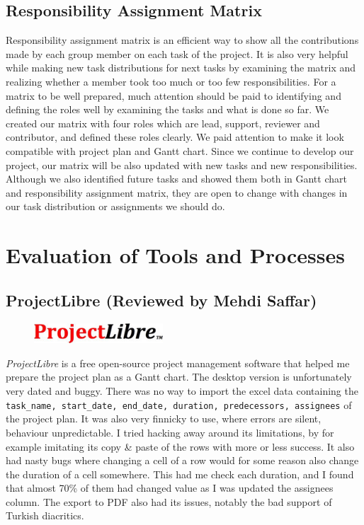 \documentclass[]{article}
\begin{document}
\hypertarget{responsibility-assignment-matrix}{%
    \subsection{Responsibility Assignment
        Matrix}\label{responsibility-assignment-matrix}}

Responsibility assignment matrix is an efficient way to show all the
contributions made by each group member on each task of the project. It
is also very helpful while making new task distributions for next tasks
by examining the matrix and realizing whether a member took too much or
too few responsibilities. For a matrix to be well prepared, much
attention should be paid to identifying and defining the roles well by
examining the tasks and what is done so far. We created our matrix with
four roles which are lead, support, reviewer and contributor, and
defined these roles clearly. We paid attention to make it look
compatible with project plan and Gantt chart. Since we continue to
develop our project, our matrix will be also updated with new tasks and
new responsibilities. Although we also identified future tasks and
showed them both in Gantt chart and responsibility assignment matrix,
they are open to change with changes in our task distribution or
assignments we should do.

\hypertarget{evaluation-of-tools-and-processes}{%
    \section{Evaluation of Tools and
      Processes}\label{evaluation-of-tools-and-processes}}

\hypertarget{projectlibre-reviewed-by-mehdi-saffar}{%
    \subsection{ProjectLibre (Reviewed by Mehdi
        Saffar)}\label{projectlibre-reviewed-by-mehdi-saffar}}

\begin{figure}
    \centering
    \includegraphics[height=0.3in]{./images/3.jpg}
\end{figure}

\emph{ProjectLibre} is a free open-source project management software
that helped me prepare the project plan as a Gantt chart. The desktop
version is unfortunately very dated and buggy. There was no way to
import the excel data containing the
\texttt{task\_name,\ start\_date,\ end\_date,\ duration,\ predecessors,\ assignees}
of the project plan. It was also very finnicky to use, where errors are
silent, behaviour unpredictable. I tried hacking away around its
limitations, by for example imitating its copy \& paste of the rows with
more or less success. It also had nasty bugs where changing a cell of a
row would for some reason also change the duration of a cell somewhere.
This had me check each duration, and I found that almost 70\% of them
had changed value as I was updated the assignees column. The export to
PDF also had its issues, notably the bad support of Turkish diacritics.
\end{document}
